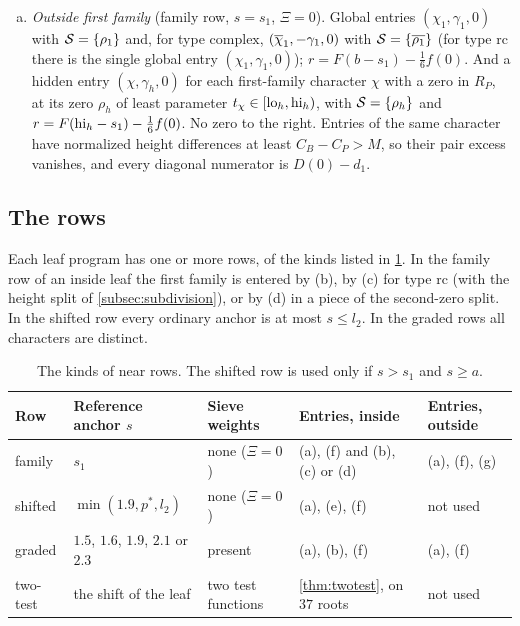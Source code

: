\begin{enumerate}[(a)]
    second-family columns, the column $[\lo_{2,j},\hi_{2,j}]$ uses $\sigma=\min(\max(a,\min(l_2,\lo_{2,j})),s)$,
    $r=F(\hi_{2,j}-\sigma)-\frac16f(0)$ and the diagonal numerator $D(s-\sigma)-d_1$.
  \item \emph{Outside first family} (family row, $s=s_1$, $\Xi=0$). Global entries $(\chi_1,\gamma_1,0)$ with
    $\mathcal{S}=\{\rho_1\}$ and, for type $\mathrm{complex}$, $(\overline{\chi}_1,-\gamma_1,0)$ with $\mathcal{S}=\{\overline{\rho_1}\}$ (for
    type $\mathrm{rc}$ there is the single global entry $(\chi_1,\gamma_1,0)$); $r=F(b-s_1)-\frac16f(0)$. And a
    hidden entry $(\chi,\gamma_h,0)$ for each first-family character $\chi$ with a zero in $R_P$, at its zero
    $\rho_h$ of least parameter $t_\chi\in[\mathrm{lo}_h,\mathrm{hi}_h)$, with $\mathcal{S}=\{\rho_h\}$ and $r=F(\mathrm{hi}_h-s_1)-\frac16f(0)$.
    No zero to the right. Entries of the same character have normalized height differences at least
    $C_B-C_P>M$, so their pair excess vanishes, and every diagonal numerator is $D(0)-d_1$.
\end{enumerate}

\subsection{The rows}\label{subsec:rowkinds}
Each leaf program has one or more rows, of the kinds listed in \cref{tab:rowkinds}. In the family
row of an inside leaf the first family is entered by (b), by (c) for type $\mathrm{rc}$ (with the
height split of \cref{subsec:subdivision}), or by (d) in a piece of the second-zero split. In the
shifted row every ordinary anchor is at most $s\le l_2$. In the graded rows all characters are
distinct.

\begin{table}[ht]
\centering
\small
\begin{tabular}{@{}lllll@{}}
\toprule
Row & Reference anchor $s$ & Sieve weights & Entries, inside & Entries, outside\\
\midrule
family & $s_1$ & none ($\Xi=0$) & (a), (f) and (b), (c) or (d) & (a), (f), (g)\\
shifted & $\min(1.9,p^*,l_2)$ & none ($\Xi=0$) & (a), (e), (f) & not used\\
graded & $1.5$, $1.6$, $1.9$, $2.1$ or $2.3$ & present & (a), (b), (f) & (a), (f)\\
two-test & the shift of the leaf & two test functions & \cref{thm:twotest}, on $37$ roots & not used\\
\bottomrule
\end{tabular}
\caption{The kinds of near rows. The shifted row is used only if $s>s_1$ and $s\ge a$.}
\label{tab:rowkinds}
\end{table}

